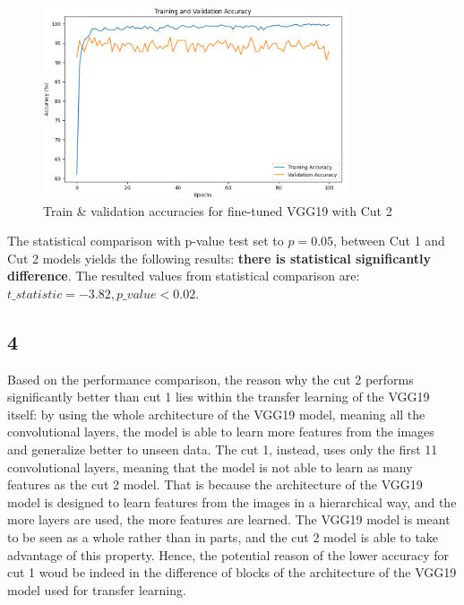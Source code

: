 \documentclass[11pt]{scrartcl}
\begin{document}
\begin{figure}[htbp]
\centering
\includegraphics[width=0.8\textwidth]{./figures/task3-cut2-accuracy.png}
\caption{Train \& validation accuracies for fine-tuned VGG19 with Cut 2}
\label{fig:task3-cut2-accuracy}
\end{figure}


The statistical comparison with p-value test set to 
\( p = 0.05 \),
between Cut 1 and Cut 2 models yields 
the following results:
\textbf{there is statistical significantly difference}.
The resulted values from statistical comparison are:
\( t\_statistic = -3.82, p\_value < 0.02 \).

\subsection*{4}

Based on the performance comparison, 
the reason why the cut 2 performs significantly better than cut 1
lies within the transfer learning of the VGG19 itself:
by using the whole architecture of the VGG19 model,
meaning all the convolutional layers,
the model is able to learn more features from the images
and generalize better to unseen data.
The cut 1, instead, uses only the first 11 convolutional layers,	
meaning that the model is not able to learn as many features as the cut 2 model.
That is because the architecture of the VGG19 model is designed to learn
features from the images in a hierarchical way,
and the more layers are used, the more features are learned.
The VGG19 model is meant to be seen as a whole rather than in parts,
and the cut 2 model is able to take advantage of this property.
Hence, the potential reason of the lower accuracy for cut 1 
woud be indeed in the difference of blocks of the architecture
of the VGG19 model used for transfer learning.
\end{document}
